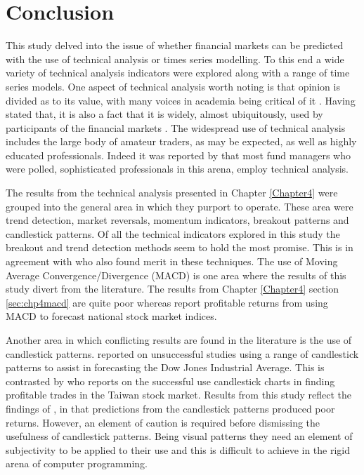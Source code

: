 \section{Conclusion}
This study delved into the issue of whether financial markets can be predicted with the use of technical analysis or times series modelling.  To this end a wide variety of technical analysis indicators were explored along with a range of time series models. One aspect of technical analysis worth noting is that opinion is divided as to its value, with many voices in academia being critical of it \citep{Kuang2014192, Fang201430, Bajgrowicz2012473}. Having stated that, it is also a fact that it is widely, almost ubiquitously, used by participants of the financial markets \citep{Taylor1992304}. The widespread use of technical analysis includes the large body of amateur traders, as may be expected, as well as highly educated professionals. Indeed it was reported by \cite{Menkhoff20102573} that most fund managers who were polled, sophisticated professionals in this arena, employ technical analysis.

The results from the technical analysis presented in Chapter \ref{Chapter4} were grouped into the general area in which they purport to operate. These area were trend detection, market reversals, momentum indicators, breakout patterns and candlestick patterns. Of all the technical indicators explored in this study the breakout and trend detection methods seem to hold the most promise. This is in agreement with \cite{Brock} who also found merit in these techniques. The use of Moving Average Convergence/Divergence (MACD) is one area where the results of this study divert from the literature. The results from Chapter \ref{Chapter4} section \ref{sec:chp4macd} are quite poor whereas \cite{Prodan2013214} report profitable returns from using MACD to forecast national stock market indices.

Another area in which conflicting results are found in the literature is the use of candlestick patterns.  \cite{Marshall20062303} reported on unsuccessful studies using a range of candlestick patterns to assist in forecasting the Dow Jones Industrial Average. This is contrasted by \cite{Lu201465} who reports on the successful use candlestick charts in finding profitable trades in the Taiwan stock market.  Results from this study reflect the findings of \cite{Marshall20062303}, in that predictions from the candlestick patterns produced poor returns. However, an element of caution is required before dismissing the usefulness of candlestick patterns. Being visual patterns they need an element of subjectivity to be applied to their use and this is difficult to achieve in the rigid arena of computer programming. %

